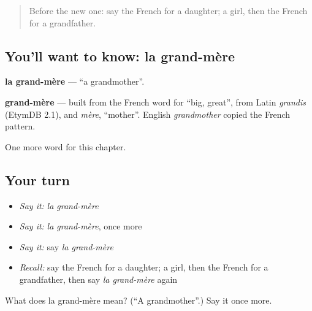 \label{lesson:FR-C56-grand-mere}



\begin{quote}
Before the new one: say the French for a daughter; a girl, then the French for a grandfather.
\end{quote}

\subsection*{You'll want to know: la grand-mère}
\textbf{la grand-mère} — \textquotedblleft{}a grandmother\textquotedblright{}.

\begin{cousinweb}
\textbf{grand-mère} — built from the French word for \textquotedblleft{}big, great\textquotedblright{}, from Latin \emph{grandis} (EtymDB 2.1), and \emph{mère}, \textquotedblleft{}mother\textquotedblright{}. English \emph{grandmother} copied the French pattern.
\end{cousinweb}

\begin{grammarlens}[title={What you've built}]
One more word for this chapter.
\end{grammarlens}

\subsection*{Your turn}
\begin{itemize}
\raggedright
  \item \emph{Say it:} \emph{la grand-mère}
  \item \emph{Say it:} \emph{la grand-mère}, once more
  \item \emph{Say it:} say \emph{la grand-mère}
  \item \emph{Recall:} say the French for a daughter; a girl, then the French for a grandfather, then say \emph{la grand-mère} again
\end{itemize}

\begin{tcolorbox}[breakable,colback=teal!4,colframe=teal!35!black,title={Before you move on}]
What does la grand-mère mean? (\textquotedblleft{}A grandmother\textquotedblright{}.) Say it once more.
\end{tcolorbox}
